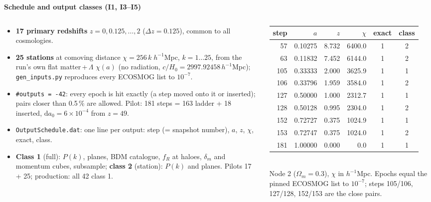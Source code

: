 \documentclass[UTF8]{beamer}
\begin{document}
\begin{frame}{\textbf{Schedule and output classes (I1, I3--I5)}}
  \footnotesize
  \begin{columns}[T]
    \begin{column}{0.57\textwidth}
      \begin{itemize}
        \item \textbf{17 primary redshifts} $z = 0, 0.125, \ldots, 2$ ($\Delta z = 0.125$), common to all cosmologies.
        \item \textbf{25 stations} at comoving distance $\chi = 256\,k\;h^{-1}$Mpc, $k = 1\ldots25$, from the run's own
          flat matter\,+\,$\Lambda$ $\chi(a)$ (no radiation, $c/H_0 = 2997.92458\,h^{-1}$Mpc);
          \texttt{gen\_inputs.py} reproduces every ECOSMOG list to $10^{-7}$.
        \item \texttt{\#outputs = -42}: every epoch is hit exactly (a step moved onto it or inserted); pairs closer
          than 0.5\,\% are allowed. Pilot: 181 steps = 163 ladder + 18 inserted, $\mathrm{d}a_0 = 6\times10^{-4}$ from $z = 49$.
        \item \texttt{OutputSchedule.dat}: one line per output: step (= snapshot number), $a$, $z$, $\chi$, exact, class.
        \item \textbf{Class 1} (full): $P(k)$, planes, BDM catalogue, $f_R$ at haloes, $\delta_m$ and momentum cubes,
          subsample; \textbf{class 2} (station): $P(k)$ and planes. Pilots 17 + 25; production: all 42 class 1.
      \end{itemize}
    \end{column}
    \begin{column}{0.41\textwidth}
      \scriptsize
      \begin{tabular}{@{}rrrrcc@{}}
        \toprule
        step & $a$ & $z$ & $\chi$ & exact & class \\
        \midrule
        57  & 0.10275 & 8.732 & 6400.0 & 1 & 2 \\
        63  & 0.11832 & 7.452 & 6144.0 & 1 & 2 \\
        105 & 0.33333 & 2.000 & 3625.9 & 1 & 1 \\
        106 & 0.33796 & 1.959 & 3584.0 & 1 & 2 \\
        127 & 0.50000 & 1.000 & 2312.7 & 1 & 1 \\
        128 & 0.50128 & 0.995 & 2304.0 & 1 & 2 \\
        152 & 0.72727 & 0.375 & 1024.9 & 1 & 1 \\
        153 & 0.72747 & 0.375 & 1024.0 & 1 & 2 \\
        181 & 1.00000 & 0.000 & 0.0    & 1 & 1 \\
        \bottomrule
      \end{tabular}
      \\[1ex]
      \scriptsize Node 2 ($\Omega_m = 0.3$), $\chi$ in $h^{-1}$Mpc. Epochs equal the pinned ECOSMOG list to $10^{-7}$;
      steps 105/106, 127/128, 152/153 are the close pairs.
    \end{column}
  \end{columns}
\end{frame}
\end{document}
